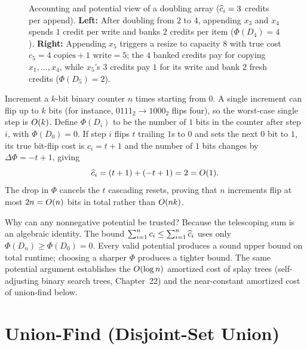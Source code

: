 \begin{figure}[htbp]
\caption{Accounting and potential view of a doubling array ($\widehat{c}_i = 3$ credits per append). \textbf{Left:} After doubling from $2$ to $4$, appending $x_3$ and $x_4$ spends $1$ credit per write and banks $2$ credits per item ($\Phi(D_4)=4$). \textbf{Right:} Appending $x_5$ triggers a resize to capacity $8$ with true cost $c_5 = 4\text{ copies} + 1\text{ write} = 5$; the $4$ banked credits pay for copying $x_1,\dots,x_4$, while $x_5$'s $3$ credits pay $1$ for its write and bank $2$ fresh credits ($\Phi(D_5)=2$).}
\label{ch42:fig-amortized-bank}
\end{figure}

\begin{example}
\label{ch42:ex-counter}
Increment a $k$-bit binary counter $n$ times starting from $0$. A single increment can flip up to $k$ bits (for instance, $0111_2 \to 1000_2$ flips four), so the worst-case single step is $O(k)$. Define $\Phi(D_i)$ to be the number of $1$ bits in the counter after step $i$, with $\Phi(D_0) = 0$. If step $i$ flips $t$ trailing $1$s to $0$ and sets the next $0$ bit to $1$, its true bit-flip cost is $c_i = t + 1$ and the number of $1$ bits changes by $\Delta\Phi = -t + 1$, giving
\[
  \widehat{c}_i = (t + 1) + (-t + 1) = 2 = O(1).
\]
The drop in $\Phi$ cancels the $t$ cascading resets, proving that $n$ increments flip at most $2n = O(n)$ bits in total rather than $O(nk)$.
\end{example}

\begin{whybox}
Why can any nonnegative potential be trusted? Because the telescoping sum is an algebraic identity. The bound $\sum_{i=1}^n c_i \le \sum_{i=1}^n \widehat{c}_i$ uses only $\Phi(D_n) \ge \Phi(D_0) = 0$. Every valid potential produces a sound upper bound on total runtime; choosing a sharper $\Phi$ produces a tighter bound. The same potential argument establishes the $O(\log n)$ amortized cost of splay trees (self-adjusting binary search trees, Chapter~22) and the near-constant amortized cost of union-find below.
\end{whybox}

\section{Union-Find (Disjoint-Set Union)}
\label{ch42:unionfind}

